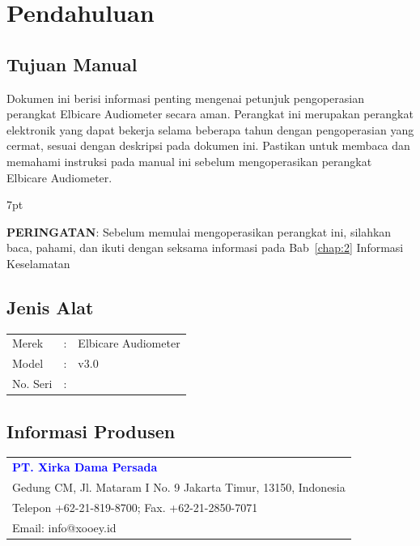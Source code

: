\documentclass[11pt,a4paper,twoside,onecolumn]{book}
\newenvironment{formalred}{%
	\def\FrameCommand{%
		\hspace{1pt}%
		{\color{red}\vrule width 2pt}%
		{\color{formalshade}\vrule width 4pt}%
		\colorbox{formalshade}%
	}%
	\MakeFramed{\advance\hsize-\width\FrameRestore}%
	\noindent\hspace{-4.55pt}%
	\begin{adjustwidth}{}{7pt}%
		\vspace{2pt}\vspace{2pt}%
	}
	{%
		\vspace{2pt}\end{adjustwidth}\endMakeFramed%
}
\begin{document}
	\renewcommand\listtablename{Daftar Tabel}
	\listoftables
	\newpage
	
	\renewcommand\chaptername{Bab}
	
	\chapter{Pendahuluan}
		\section{Tujuan Manual}
		Dokumen ini berisi informasi penting mengenai petunjuk pengoperasian perangkat Elbicare Audiometer secara aman. Perangkat ini merupakan perangkat elektronik yang dapat bekerja selama beberapa tahun dengan pengoperasian yang cermat, sesuai dengan deskripsi pada dokumen ini. Pastikan untuk membaca dan memahami instruksi pada manual ini sebelum mengoperasikan perangkat Elbicare Audiometer. 
		
		\begin{formalred}
			\raisebox{0.325ex}{\resizebox{!}{2ex}{\danger}} \textbf{PERINGATAN}:
			Sebelum memulai mengoperasikan perangkat ini, silahkan baca, pahami, dan ikuti dengan seksama informasi pada Bab~\ref{chap:2} Informasi Keselamatan 
		\end{formalred}
		
		\section{Jenis Alat}
		\begin{tabular}{lcl}
			Merek & : & Elbicare Audiometer\\
			Model & : & v3.0\\
			No. Seri & : & \\
		\end{tabular}
		
		\section{Informasi Produsen}
		\begin{tabular}{l}
			\textbf{\textcolor{blue}{PT. Xirka Dama Persada}}\\
			Gedung CM, Jl. Mataram I No. 9 Jakarta Timur, 13150, Indonesia\\
			Telepon +62-21-819-8700; Fax. +62-21-2850-7071\\
			Email: info@xooey.id\\
		\end{tabular}
		
\end{document}
